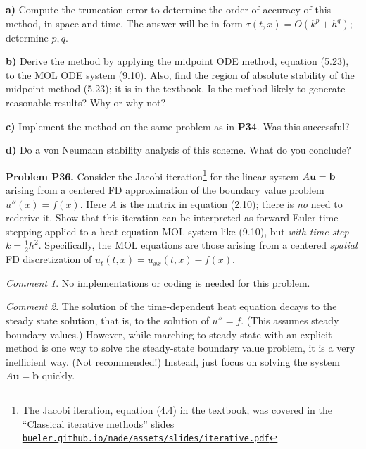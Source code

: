 \documentclass[12pt]{amsart}
\newcommand{\bb}{\mathbf{b}}
\newcommand{\bu}{\mathbf{u}}
\newcommand{\prob}[1]{\bigskip\noindent\textbf{#1}\quad }
\newcommand{\epart}[1]{\medskip\noindent\textbf{#1)}\quad }
\begin{document}
\epart{a} Compute the truncation error to determine the order of accuracy of this method, in space and time.  The answer will be in form $\tau(t,x) = O(k^p + h^q)$; determine $p,q$.

\epart{b} Derive the method by applying the midpoint ODE method, equation (5.23), to the MOL ODE system (9.10).   Also, find the region of absolute stability of the midpoint method (5.23); it is in the textbook.  Is the method likely to generate reasonable results?  Why or why not?

\epart{c} Implement the method on the same problem as in \textbf{P34}.  Was this successful?

\epart{d} Do a von Neumann stability analysis of this scheme.  What do you conclude?


\prob{Problem P36.}  Consider the Jacobi iteration\footnote{The Jacobi iteration, equation (4.4) in the textbook, was covered in the ``Classical iterative methods'' slides \quad \href{https://bueler.github.io/nade/assets/slides/iterative.pdf}{\texttt{bueler.github.io/nade/assets/slides/iterative.pdf}}} for the linear system $A\bu=\bb$ arising from a centered FD approximation of the boundary value problem $u''(x) = f(x)$.  Here $A$ is the matrix in equation (2.10); there is \emph{no} need to rederive it.  Show that this iteration can be interpreted as forward Euler time-stepping applied to a heat equation MOL system like (9.10), but \emph{with time step} $k = \frac{1}{2} h^2$.  Specifically, the MOL equations are those arising from a centered \emph{spatial} FD discretization of $u_t(t,x) = u_{xx}(t,x) - f(x)$.

\medskip \noindent
\emph{Comment 1}.  No implementations or coding is needed for this problem.

\medskip \noindent
\emph{Comment 2}.  The solution of the time-dependent heat equation decays to the steady state solution, that is, to the solution of $u'' = f$.  (This assumes steady boundary values.)  However, while marching to steady state with an explicit method is one way to solve the steady-state boundary value problem, it is a very inefficient way.  (Not recommended!)  Instead, just focus on solving the system $A\bu=\bb$ quickly.
\end{document}
